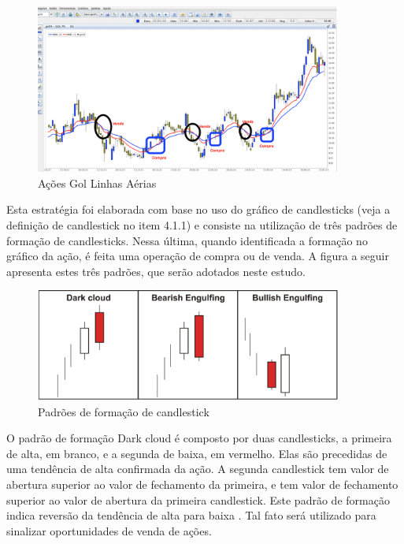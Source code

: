 \begin{figure}[h]
\centering
\label{f17}
\includegraphics[width=0.9\textwidth]{figuras/f17}
\caption{Ações Gol Linhas Aérias}
\end{figure}



Esta estratégia foi elaborada com base no uso do gráfico de candlesticks (veja a definição de candlestick no item 4.1.1) e consiste na utilização de três padrões de formação de candlesticks. Nessa última, quando identificada a formação no gráfico da ação, é feita uma operação de compra ou de venda. A figura a seguir apresenta estes três padrões, que serão adotados neste estudo.

\begin{figure}[h]
\centering
\label{f18}
\includegraphics[width=0.9\textwidth]{figuras/f18}
\caption{Padrões de formação de candlestick}
\end{figure}


O padrão de formação Dark cloud é composto por duas candlesticks, a primeira de alta, em branco, e a segunda de baixa, em vermelho. Elas são precedidas de uma tendência de alta confirmada da ação. A segunda candlestick tem valor de abertura superior ao valor de fechamento da primeira, e tem valor de fechamento superior ao valor de abertura da primeira candlestick. Este padrão de formação indica reversão da tendência de alta para baixa \cite[p.61]{matsura2006}. Tal fato será utilizado para sinalizar oportunidades de venda de ações.


